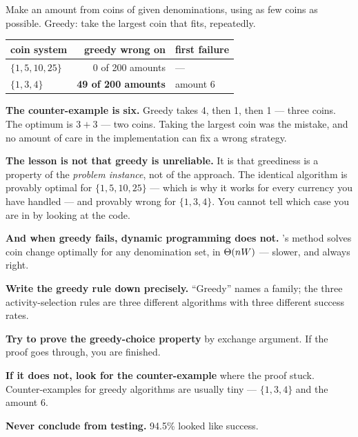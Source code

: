 \begin{worked}
Make an amount from coins of given denominations, using as few coins as
possible. Greedy: take the largest coin that fits, repeatedly.

\begin{center}
\begin{tabular}{@{}lrl@{}}
\toprule
\rowcolor{primary!15}
coin system & greedy wrong on & first failure \\
\midrule
$\{1, 5, 10, 25\}$ & 0 of 200 amounts & --- \\
$\{1, 3, 4\}$ & \textbf{49 of 200 amounts} & amount 6 \\
\bottomrule
\end{tabular}
\end{center}

\smallskip
\textbf{The counter-example is six.} Greedy takes 4, then 1, then 1 --- three
coins. The optimum is $3 + 3$ --- two coins. Taking the largest coin was the
mistake, and no amount of care in the implementation can fix a wrong strategy.

\smallskip
\textbf{The lesson is not that greedy is unreliable.} It is that greediness is
a property of the \emph{problem instance}, not of the approach. The identical
algorithm is provably optimal for $\{1,5,10,25\}$ --- which is why it works for
every currency you have handled --- and provably wrong for $\{1,3,4\}$. You
cannot tell which case you are in by looking at the code.

\smallskip
\textbf{And when greedy fails, dynamic programming does not.} 's
method solves coin change optimally for any denomination set, in
$\Theta(nW)$ --- slower, and always right.
\end{worked}

\begin{alertbox}
\begin{tightnum}
  \item \textbf{Write the greedy rule down precisely.} ``Greedy'' names a
        family; the three activity-selection rules are three different
        algorithms with three different success rates.
  \item \textbf{Try to prove the greedy-choice property} by exchange argument.
        If the proof goes through, you are finished.
  \item \textbf{If it does not, look for the counter-example} where the proof
        stuck. Counter-examples for greedy algorithms are usually tiny ---
        $\{1,3,4\}$ and the amount 6.
  \item \textbf{Never conclude from testing.} 94.5\% looked like success.
\end{tightnum}
\end{alertbox}

